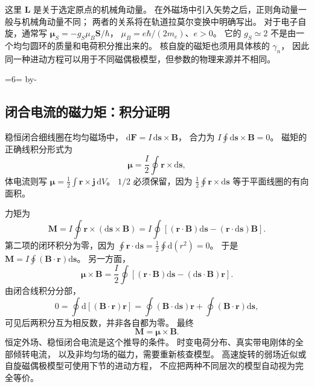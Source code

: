 \documentclass[UTF8,zihao=-4,fontset=fandol,a4paper]{ctexart}
\makeatletter
\newcommand{\vect}[1]{\bm{#1}}
\newcommand{\dd}{\mathrm d}
\newcommand{\Needspace}[1]{\par\if@nobreak\else\penalty0\begingroup\dimen0=#1\relax\dimen2=\pagegoal\advance\dimen2 by-\pagetotal\ifdim\dimen0>\dimen2\newpage\fi\endgroup\fi}
\let\SavedSubsection\subsection
\renewcommand{\subsection}{\Needspace{6\baselineskip}\SavedSubsection}
\makeatother
\begin{document}
这里 $\vect L$ 是关于选定原点的机械角动量。
在外磁场中引入矢势之后，正则角动量一般与机械角动量不同；
两者的关系将在轨道拉莫尔变换中明确写出。
对于电子自旋，通常写
$\vect\mu_S=-g_S\mu_B\vect S/\hbar$，
$\mu_B=e\hbar/(2m_e)$、$e>0$。
它的 $g_S\simeq2$ 不是由一个均匀圆环的质量和电荷积分推出来的。
核自旋的磁矩也须用具体核的 $\gamma_n$，
因此同一种进动方程可以用于不同磁偶极模型，但参数的物理来源并不相同。


\subsection{闭合电流的磁力矩：积分证明}\label{sub:c3-10.2}
稳恒闭合细线圈在均匀磁场中，
$\dd\vect F=I\,\dd\vect s\times\vect B$，
合力为 $I\oint\dd\vect s\times\vect B=0$。
磁矩的正确线积分形式为
\begin{equation}
\vect\mu=\frac I2\oint\vect r\times\dd\vect s,
\end{equation}
体电流则写
$\vect\mu=\tfrac12\int\vect r\times\vect j\,\dd V$。
$1/2$ 必须保留，因为
$\tfrac12\oint\vect r\times\dd\vect s$
等于平面线圈的有向面积。

力矩为
\[
\vect M=I\oint\vect r\times(\dd\vect s\times\vect B)
=I\oint[(\vect r\cdot\vect B)\dd\vect s
-(\vect r\cdot\dd\vect s)\vect B].
\]
第二项的闭环积分为零，因为
$\oint\vect r\cdot\dd\vect s=\tfrac12\oint\dd(r^2)=0$。
于是 $\vect M=I\oint(\vect B\cdot\vect r)\dd\vect s$。
另一方面，
\[
\vect\mu\times\vect B
=\frac I2\oint[(\vect r\cdot\vect B)\dd\vect s
-(\dd\vect s\cdot\vect B)\vect r].
\]
由闭合线积分分部，
\[
0=\oint\dd[(\vect B\cdot\vect r)\vect r]
=\oint(\vect B\cdot\dd\vect s)\vect r
+\oint(\vect B\cdot\vect r)\dd\vect s,
\]
可见后两积分互为相反数，并非各自都为零。
最终
\begin{equation}\label{eq:magtorque}
\vect M=\vect\mu\times\vect B.
\end{equation}
恒定外场、稳恒闭合电流是这个推导的条件。
时变电荷分布、真实带电刚体的全部倾转电流，
以及非均匀场的磁力，需要重新核查模型。
高速旋转的弱场近似或自旋磁偶极模型可使用下节的进动方程，
不应把两种不同层次的模型自动视为完全等价。
\end{document}
